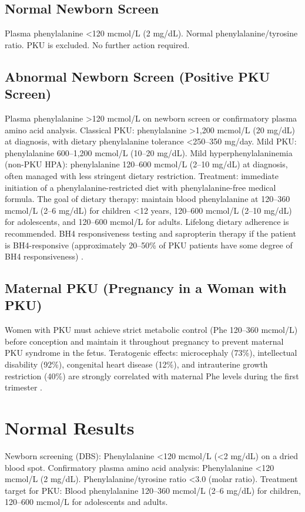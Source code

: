 \subsection*{Normal Newborn Screen}
Plasma phenylalanine <120 mcmol/L (2 mg/dL). Normal phenylalanine/tyrosine ratio. PKU is excluded. No further action required.

\subsection*{Abnormal Newborn Screen (Positive PKU Screen)}
Plasma phenylalanine >120 mcmol/L on newborn screen or confirmatory plasma amino acid analysis. Classical PKU: phenylalanine >1,200 mcmol/L (20 mg/dL) at diagnosis, with dietary phenylalanine tolerance <250--350 mg/day. Mild PKU: phenylalanine 600--1,200 mcmol/L (10--20 mg/dL). Mild hyperphenylalaninemia (non-PKU HPA): phenylalanine 120--600 mcmol/L (2--10 mg/dL) at diagnosis, often managed with less stringent dietary restriction. Treatment: immediate initiation of a phenylalanine-restricted diet with phenylalanine-free medical formula. The goal of dietary therapy: maintain blood phenylalanine at 120--360 mcmol/L (2--6 mg/dL) for children <12 years, 120--600 mcmol/L (2--10 mg/dL) for adolescents, and 120--600 mcmol/L for adults. Lifelong dietary adherence is recommended. BH4 responsiveness testing and sapropterin therapy if the patient is BH4-responsive (approximately 20--50\% of PKU patients have some degree of BH4 responsiveness) \cite{vockley2014phenylalanine}.

\subsection*{Maternal PKU (Pregnancy in a Woman with PKU)}
Women with PKU must achieve strict metabolic control (Phe 120--360 mcmol/L) before conception and maintain it throughout pregnancy to prevent maternal PKU syndrome in the fetus. Teratogenic effects: microcephaly (73\%), intellectual disability (92\%), congenital heart disease (12\%), and intrauterine growth restriction (40\%) are strongly correlated with maternal Phe levels during the first trimester \cite{platt2000maternal}.

\section*{Normal Results}
Newborn screening (DBS): Phenylalanine <120 mcmol/L (<2 mg/dL) on a dried blood spot. Confirmatory plasma amino acid analysis: Phenylalanine <120 mcmol/L (2 mg/dL). Phenylalanine/tyrosine ratio <3.0 (molar ratio). Treatment target for PKU: Blood phenylalanine 120--360 mcmol/L (2--6 mg/dL) for children, 120--600 mcmol/L for adolescents and adults.

